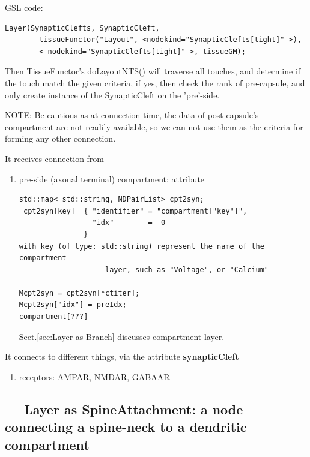 GSL code:
\begin{verbatim}
Layer(SynapticClefts, SynapticCleft, 
        tissueFunctor("Layout", <nodekind="SynapticClefts[tight]" >), 
        < nodekind="SynapticClefts[tight]" >, tissueGM);
\end{verbatim}
Then TissueFunctor's doLayoutNTS() will traverse all touches, and determine
if the touch match the given criteria, if yes, then check the rank of
pre-capsule, and only create instance of the SynapticCleft on
the 'pre'-side.

NOTE: Be cautious as at connection time, the data of post-capsule's compartment
are not readily available, so we can not use them as the criteria for forming
any other connection.
% 


It receives connection from 
\begin{enumerate}
  \item pre-side (axonal terminal) compartment: attribute
  
\begin{verbatim}
std::map< std::string, NDPairList> cpt2syn;   
 cpt2syn[key]  { "identifier" = "compartment["key"]",
                 "idx"        =  0
               }
with key (of type: std::string) represent the name of the compartment
                    layer, such as "Voltage", or "Calcium"

Mcpt2syn = cpt2syn[*ctiter];
Mcpt2syn["idx"] = preIdx; 
compartment[???]
\end{verbatim}
Sect.\ref{sec:Layer-as-Branch} discusses compartment layer.

\end{enumerate}

It connects to different things, via the attribute {\bf synapticCleft}
\begin{enumerate}
  \item receptors: AMPAR, NMDAR, GABAAR
\end{enumerate}

\subsection{--- Layer as SpineAttachment: a node connecting a spine-neck to a
dendritic compartment}
\label{sec:SpineAttachment}

